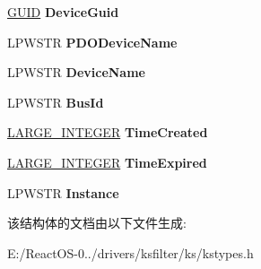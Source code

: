 \begin{DoxyCompactItemize}
\hyperlink{interface_g_u_i_d}{G\+U\+ID} {\bfseries Device\+Guid}
\item 
\mbox{\label{struct_____b_u_s___d_e_v_i_c_e___e_n_t_r_y_____a29496bcd8dcb1cb62a1d062be49cbf2f}} 
L\+P\+W\+S\+TR {\bfseries P\+D\+O\+Device\+Name}
\item 
\mbox{\label{struct_____b_u_s___d_e_v_i_c_e___e_n_t_r_y_____a5cf7cbdd19a8af9bbd7887fe2cda09b5}} 
L\+P\+W\+S\+TR {\bfseries Device\+Name}
\item 
\mbox{\label{struct_____b_u_s___d_e_v_i_c_e___e_n_t_r_y_____a2fbc29d2701e5c7124b41a63f7e5f188}} 
L\+P\+W\+S\+TR {\bfseries Bus\+Id}
\item 
\mbox{\label{struct_____b_u_s___d_e_v_i_c_e___e_n_t_r_y_____aa59659f76c97f61c715881b0e5a6181d}} 
\hyperlink{union___l_a_r_g_e___i_n_t_e_g_e_r}{L\+A\+R\+G\+E\+\_\+\+I\+N\+T\+E\+G\+ER} {\bfseries Time\+Created}
\item 
\mbox{\label{struct_____b_u_s___d_e_v_i_c_e___e_n_t_r_y_____a398309cfb34cc86cfbf75be7a9775acc}} 
\hyperlink{union___l_a_r_g_e___i_n_t_e_g_e_r}{L\+A\+R\+G\+E\+\_\+\+I\+N\+T\+E\+G\+ER} {\bfseries Time\+Expired}
\item 
\mbox{\label{struct_____b_u_s___d_e_v_i_c_e___e_n_t_r_y_____a8a8d0915ec1cdc611258acfefbeeb461}} 
L\+P\+W\+S\+TR {\bfseries Instance}
\end{DoxyCompactItemize}


该结构体的文档由以下文件生成\+:\begin{DoxyCompactItemize}
\item 
E\+:/\+React\+O\+S-\/0../drivers/ksfilter/ks/kstypes.\+h\end{DoxyCompactItemize}
